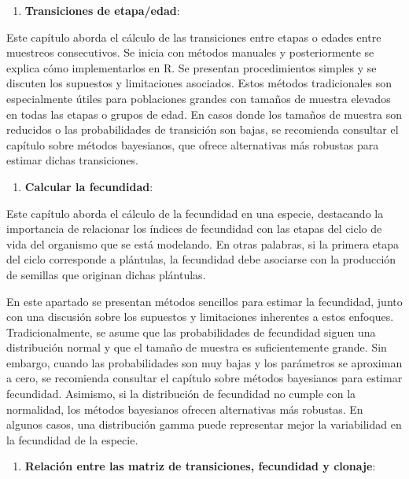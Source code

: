 \documentclass[
  12pt,
  letterpaper,
]{book}
\providecommand{\tightlist}{%
  \setlength{\itemsep}{0pt}\setlength{\parskip}{0pt}}\usepackage{longtable,booktabs,array}
\begin{document}
\begin{enumerate}
\def\labelenumi{\arabic{enumi}.}
\setcounter{enumi}{2}
\tightlist
\item
  \textbf{Transiciones de etapa/edad}:
\end{enumerate}

Este capítulo aborda el cálculo de las transiciones entre etapas o
edades entre muestreos consecutivos. Se inicia con métodos manuales y
posteriormente se explica cómo implementarlos en R. Se presentan
procedimientos simples y se discuten los supuestos y limitaciones
asociados. Estos métodos tradicionales son especialmente útiles para
poblaciones grandes con tamaños de muestra elevados en todas las etapas
o grupos de edad. En casos donde los tamaños de muestra son reducidos o
las probabilidades de transición son bajas, se recomienda consultar el
capítulo sobre métodos bayesianos, que ofrece alternativas más robustas
para estimar dichas transiciones.

\begin{enumerate}
\def\labelenumi{\arabic{enumi}.}
\setcounter{enumi}{3}
\tightlist
\item
  \textbf{Calcular la fecundidad}:
\end{enumerate}

Este capítulo aborda el cálculo de la fecundidad en una especie,
destacando la importancia de relacionar los índices de fecundidad con
las etapas del ciclo de vida del organismo que se está modelando. En
otras palabras, si la primera etapa del ciclo corresponde a plántulas,
la fecundidad debe asociarse con la producción de semillas que originan
dichas plántulas.

En este apartado se presentan métodos sencillos para estimar la
fecundidad, junto con una discusión sobre los supuestos y limitaciones
inherentes a estos enfoques. Tradicionalmente, se asume que las
probabilidades de fecundidad siguen una distribución normal y que el
tamaño de muestra es suficientemente grande. Sin embargo, cuando las
probabilidades son muy bajas y los parámetros se aproximan a cero, se
recomienda consultar el capítulo sobre métodos bayesianos para estimar
fecundidad. Asimismo, si la distribución de fecundidad no cumple con la
normalidad, los métodos bayesianos ofrecen alternativas más robustas. En
algunos casos, una distribución gamma puede representar mejor la
variabilidad en la fecundidad de la especie.

\begin{enumerate}
\def\labelenumi{\arabic{enumi}.}
\setcounter{enumi}{4}
\tightlist
\item
  \textbf{Relación entre las matriz de transiciones, fecundidad y
  clonaje}:
\end{enumerate}
\end{document}
